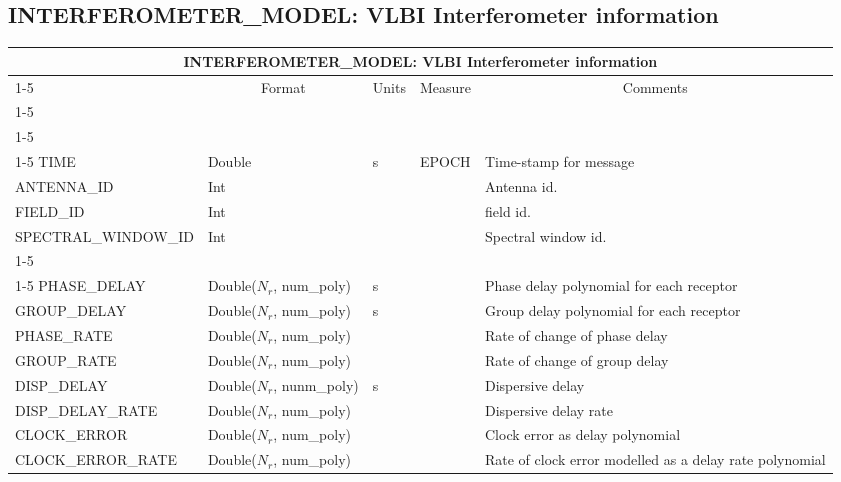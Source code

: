 \documentclass{article}
\newcommand{\nr}{$N_r$}
\newcommand{\defline}[1]{\cline{1-5}
\multicolumn{5}{|l|}{#1} \\
\cline{1-5}}
\newcommand{\definetable}[2]
{
	\vfill\newpage
	\subsection{#1}
        \vspace{0.15in}
        \small
	\begin{tabular}{|l|p{1.25in}|l|p{.9in}|p{1.4in}|}
	\hline
	\multicolumn{5}{|c|}{\bf #1}\\ 
	\cline{1-5}
        \multicolumn{1}{|c|}{Name}&\multicolumn{1}{|c|}{Format}&
        \multicolumn{1}{|c|}{Units}&\multicolumn{1}{|c|}{Measure}&
        \multicolumn{1}{|c|}{Comments}\\
        \cline{1-5}
        #2
        \hline
	\end{tabular}
}
\begin{document}
\definetable{INTERFEROMETER\_MODEL: VLBI Interferometer information}{
\defline{\bf Columns}
\defline{\em Key}
TIME & Double & s &              EPOCH  & Time-stamp for message\\
ANTENNA\_ID & Int &  &  & Antenna id.\\
FIELD\_ID  & Int   &          &        & field id.\\
SPECTRAL\_WINDOW\_ID & Int & & & Spectral window id.\\
\defline{\em Data}  
PHASE\_DELAY & Double(\nr, num\_poly) &  s  &      & Phase delay polynomial for each receptor\\
GROUP\_DELAY & Double(\nr, num\_poly) & s & & Group delay polynomial for each receptor\\
PHASE\_RATE  & Double(\nr, num\_poly) &  &  & Rate of change of phase delay\\
GROUP\_RATE & Double(\nr, num\_poly) &  &  & Rate of change of group delay \\
DISP\_DELAY & Double(\nr, nunm\_poly) & s &  & Dispersive delay\\
DISP\_DELAY\_RATE & Double(\nr, num\_poly) &  &  & Dispersive delay rate \\

CLOCK\_ERROR   & Double(\nr, num\_poly) &  &  & Clock error as delay polynomial\\

CLOCK\_ERROR\_RATE & Double(\nr, num\_poly) &  &  & Rate of clock error modelled as a delay rate polynomial \\

}
\end{document}

